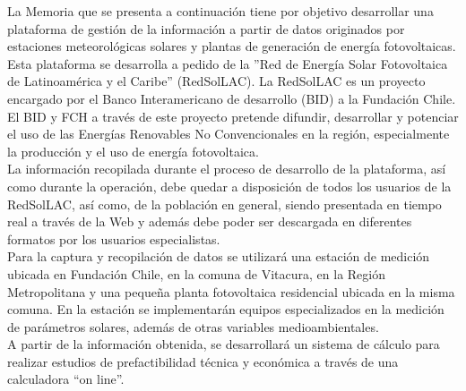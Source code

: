 La Memoria que se presenta a continuación tiene por objetivo desarrollar una plataforma de gestión de la información a partir de datos originados por estaciones meteorológicas solares y plantas de generación de energía fotovoltaicas. Esta plataforma se desarrolla a pedido de la ''Red  de Energía Solar Fotovoltaica de Latinoamérica y el Caribe'' (RedSolLAC). La RedSolLAC es un proyecto encargado por el Banco Interamericano de desarrollo (BID) a la Fundación Chile. El BID y FCH a través de este proyecto pretende difundir, desarrollar y potenciar el uso de las Energías Renovables No Convencionales en la región, especialmente la producción y el uso de energía fotovoltaica.\\

La información recopilada durante el proceso de desarrollo de la plataforma, así como durante la operación, debe quedar a disposición de todos los usuarios de la RedSolLAC, así como, de la población en general, siendo presentada en tiempo real a través de la Web y además debe poder ser descargada en diferentes formatos por los usuarios especialistas.\\

Para la captura y recopilación de datos se utilizará una estación de medición ubicada en Fundación Chile, en la comuna de Vitacura, en la Región Metropolitana y una pequeña planta fotovoltaica residencial ubicada en la misma comuna. En la estación se implementarán equipos especializados en la medición de parámetros solares, además de otras variables medioambientales.\\

A partir de la información obtenida, se desarrollará un sistema de cálculo para realizar estudios de prefactibilidad técnica y económica a través de una calculadora “on line”.
